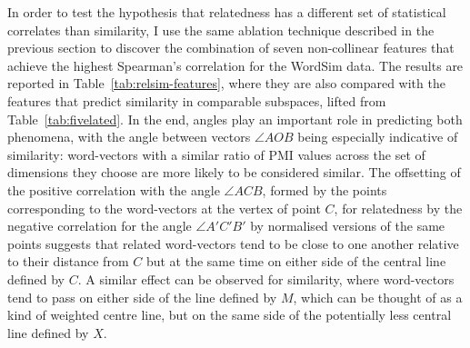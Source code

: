 In order to test the hypothesis that relatedness has a different set of statistical correlates than similarity, I use the same ablation technique described in the previous section to discover the combination of seven non-collinear features that achieve the highest Spearman's correlation for the WordSim data.  The results are reported in Table~\ref{tab:relsim-features}, where they are also compared with the features that predict similarity in comparable subspaces, lifted from Table~\ref{tab:fivelated}.  In the end, angles play an important role in predicting both phenomena, with the angle between vectors $\angle AOB$ being especially indicative of similarity: word-vectors with a similar ratio of PMI values across the set of dimensions they choose are more likely to be considered similar.  The offsetting of the positive correlation with the angle $\angle ACB$, formed by the points corresponding to the word-vectors at the vertex of point $C$, for relatedness by the negative correlation for the angle $\angle A'C'B'$ by normalised versions of the same points suggests that related word-vectors tend to be close to one another relative to their distance from $C$ but at the same time on either side of the central line defined by $C$.  A similar effect can be observed for similarity, where word-vectors tend to pass on either side of the line defined by $M$, which can be thought of as a kind of weighted centre line, but on the same side of the potentially less central line defined by $X$.

